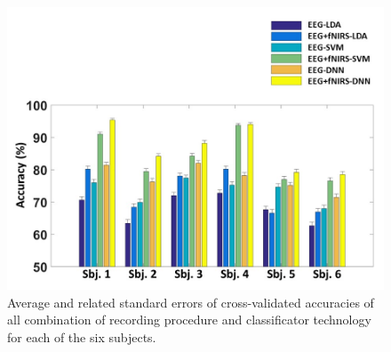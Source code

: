 \documentclass[12pt ]{iopart}
\begin{document}
\begin{figure}
	\includegraphics[width=\linewidth]{Slide6.JPG}
	\caption{Average and related standard errors of cross-validated accuracies of all combination of recording procedure and classificator technology for each of the six subjects.}
	\label{fig:fig6}
\end{figure}
\end{document}
